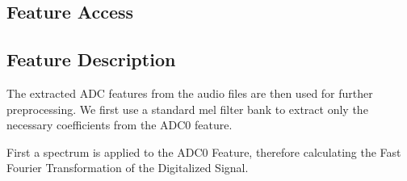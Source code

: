 \subsection{Feature Access}
\label{sec:FP:FA}

\subsection{Feature Description}
\label{sec:FP:FD}
The extracted ADC features from the audio files are then used for further preprocessing. We first use a standard mel filter bank to extract only the necessary coefficients from the ADC0 feature. 

First a spectrum is applied to the ADC0 Feature, therefore calculating the Fast Fourier Transformation of the Digitalized Signal.

	